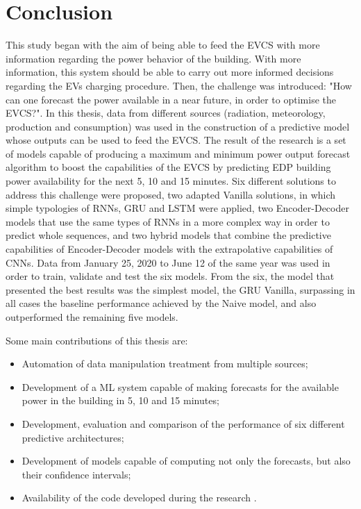 \cleardoublepage
\label{chap:conclusion}

\section{Conclusion}

This study began with the aim of being able to feed the \ac{EVCS} with more information regarding the power behavior of the building. With more information, this system should be able to carry out more informed decisions regarding the \ac{EV}s charging procedure. Then, the challenge was introduced: "How can one forecast the power available in a near future, in order to optimise the \ac{EVCS}?". In this thesis, data from different sources (radiation, meteorology, production and consumption) was used in the construction of a predictive model whose outputs can be used to feed the \ac{EVCS}. The result of the research is a set of models capable of producing a maximum and minimum power output forecast algorithm to boost the capabilities of the \ac{EVCS} by predicting \ac{EDP} building power availability for the next 5, 10 and 15 minutes. Six different solutions to address this challenge were proposed, two adapted Vanilla solutions, in which simple typologies of \ac{RNN}s, \ac{GRU} and \ac{LSTM} were applied, two Encoder-Decoder models that use the same types of \ac{RNN}s in a more complex way in order to predict whole sequences, and two hybrid models that combine the predictive capabilities of Encoder-Decoder models with the extrapolative capabilities of \ac{CNN}s. Data from January 25, 2020 to June 12 of the same year was used in order to train, validate and test the six models. From the six, the model that presented the best results was the simplest model, the \ac{GRU} Vanilla, surpassing in all cases the baseline performance achieved by the Naive model, and also outperformed the remaining five models.

Some main contributions of this thesis are:
\begin{itemize}
\setlength\itemsep{0.1em}
    \item Automation of data manipulation treatment from multiple sources;
    \item Development of a \ac{ML} system capable of making forecasts for the available power in the building in 5, 10 and 15 minutes;
    \item Development, evaluation and comparison of the performance of six different predictive architectures;
    \item Development of models capable of computing not only the forecasts, but also their confidence intervals;
    \item Availability of the code developed during the research \cite{code}.
    
\end{itemize}

